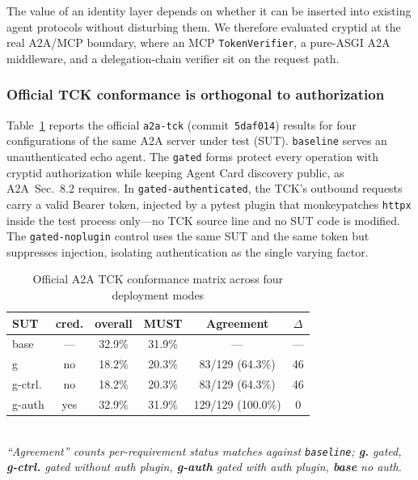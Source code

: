 \documentclass[10pt,twocolumn]{IEEEtran}
\begin{document}
The value of an identity layer depends on whether it can be inserted into
existing agent protocols without disturbing them. We therefore evaluated
cryptid at the real A2A/MCP boundary, where an MCP \texttt{TokenVerifier},
a pure-ASGI A2A middleware, and a delegation-chain verifier sit on the
request path.

\subsubsection*{Official TCK conformance is orthogonal to authorization}

Table~\ref{tab:tck} reports the official \texttt{a2a-tck}
(commit~\texttt{5daf014}) results for four configurations of the same A2A
server under test (SUT). \texttt{baseline} serves an unauthenticated echo
agent. The \texttt{gated} forms protect every operation with cryptid
authorization while keeping Agent Card discovery public, as A2A~Sec.~8.2
requires. In \texttt{gated-authenticated}, the TCK's outbound requests
carry a valid Bearer token, injected by a pytest plugin that monkeypatches
\texttt{httpx} inside the test process only---no TCK source line and no
SUT code is modified. The \texttt{gated-noplugin} control uses the same
SUT and the same token but suppresses injection, isolating authentication
as the single varying factor.

\begin{table}[t]
  \caption{Official A2A TCK conformance matrix across four deployment modes}
  \label{tab:tck}
  \centering\small\setlength{\tabcolsep}{3pt}
  \begin{tabular}{lccccc}
    \toprule
    \textbf{SUT} & \textbf{cred.} & \textbf{overall} &
    \textbf{MUST} & \textbf{Agreement} & \textbf{$\Delta$} \\
    \midrule
    base    & --- & 32.9\% & 31.9\% & ---              & --- \\
    g       & no  & 18.2\% & 20.3\% & 83/129 (64.3\%)  & 46  \\
    g-ctrl. & no  & 18.2\% & 20.3\% & 83/129 (64.3\%)  & 46  \\
    g-auth  & yes & 32.9\% & 31.9\% & 129/129 (100.0\%) & 0   \\
    \bottomrule
  \end{tabular}
\vspace{2pt}\\
\textit{``Agreement'' counts per-requirement status matches against \texttt{baseline}; \textbf{g.} gated, \textbf{g-ctrl.} gated without auth plugin, \textbf{g-auth} gated with auth plugin, \textbf{base} no auth.}
\end{table}
\end{document}
